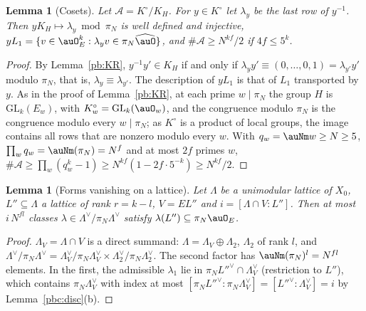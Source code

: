\documentclass[10pt]{amsart}
\newtheorem{lemma}[theorem]{Lemma}
\theoremstyle{definition}
\theoremstyle{remark}
\providecommand{\auGL}{\mathrm{GL}}
\begin{document}
\begin{lemma}[Cosets]\label{pbc:index}
Let $\mathcal A=K^\circ/K_H$. For $y\in K^\circ$ let $\lambda_y$ be the last row of $y^{-1}$. Then
$yK_H\mapsto\lambda_y\bmod\pi_N$ is well defined and injective, $yL_1=\{v\in\auO_E^k:\lambda_yv\in\pi_N
\widehat\auO\}$, and $\#\mathcal A\ge N^{kf}/2$ if $4f\le5^k$.
\end{lemma}
\begin{proof}
By Lemma~\ref{pb:KR}, $y^{-1}y'\in K_H$ if and only if $\lambda_y y'\equiv(0,\dots,0,1)=\lambda_{y'}y'$
modulo $\pi_N$, that is, $\lambda_y\equiv\lambda_{y'}$. The description of $yL_1$ is that of $L_1$
transported by $y$. As in the proof of Lemma~\ref{pb:KR}, at each prime $w\mid\pi_N$ the group $H$ is
$\auGL_k(E_w)$, with $K^\circ_w=\auGL_k(\auO_w)$, and the congruence modulo $\pi_N$ is the congruence
modulo every $w\mid\pi_N$; as $K^\circ$ is a product of local groups, the image contains all rows that are
nonzero modulo every $w$. With $q_w=\auNm w\ge N\ge5$, $\prod_wq_w=\auNm(\pi_N)=N^f$ and at most $2f$
primes $w$, $\#\mathcal A\ge\prod_w(q_w^k-1)\ge N^{kf}(1-2f\cdot5^{-k})\ge N^{kf}/2$.
\end{proof}

\begin{lemma}[Forms vanishing on a lattice]\label{pbc:forms}
Let $\Lambda$ be a unimodular lattice of $X_0$, $L''\subseteq\Lambda$ a lattice of rank $r=k-l$, $V=EL''$
and $i=[\Lambda\cap V:L'']$. Then at most $i\,N^{fl}$ classes $\lambda\in\Lambda^\vee/\pi_N\Lambda^\vee$
satisfy $\lambda(L'')\subseteq\pi_N\auO_E$.
\end{lemma}
\begin{proof}
$\Lambda_V=\Lambda\cap V$ is a direct summand: $\Lambda=\Lambda_V\oplus\Lambda_2$, $\Lambda_2$ of rank $l$, and
$\Lambda^\vee/\pi_N\Lambda^\vee=\Lambda_V^\vee/\pi_N\Lambda_V^\vee\times\Lambda_2^\vee/\pi_N\Lambda_2^\vee$. The
second factor has $\auNm(\pi_N)^l=N^{fl}$ elements. In the first, the admissible $\lambda_1$ lie in $\pi_N
L''^\vee\cap\Lambda_V^\vee$ (restriction to $L''$), which contains $\pi_N\Lambda_V^\vee$ with index at most
$[\pi_NL''^\vee:\pi_N\Lambda_V^\vee]=[L''^\vee:\Lambda_V^\vee]=i$ by Lemma~\ref{pbc:disc}(b).
\end{proof}
\end{document}
